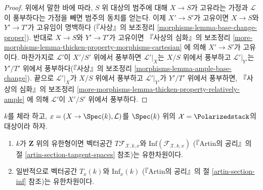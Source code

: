 \begin{proof}
\medskip\noindent
위에서 말한 바에 따라, $S$ 위 대상의 범주에 대해 $X \to S$가 고유라는
가정과 $\mathcal{L}$이 풍부하다는 가정을 빼면 범주의 동치를 얻는다.
이제 $X' \to S'$가 고유이면 $X \to S$와 $Y' \to T'$가 고유임이 명백하다
(『사상』의 보조정리
\ref{morphisms-lemma-base-change-proper}).
반대로 $X \to S$와 $Y' \to T'$가 고유이면 『사상의 심화』의 보조정리
\ref{more-morphisms-lemma-thicken-property-morphisms-cartesian}
에 의해 $X' \to S'$가 고유이다. 마찬가지로 $\mathcal{L}'$이 $X'/S'$ 위에서
풍부하면 $\mathcal{L}'|_X$는 $X/S$ 위에서 풍부하고
$\mathcal{L}'|_{Y'}$는 $Y'/T'$ 위에서 풍부하다(『사상』의 보조정리
\ref{morphisms-lemma-ample-base-change}). 끝으로 $\mathcal{L}'|_X$가 $X/S$
위에서 풍부하고 $\mathcal{L}'|_{Y'}$가 $Y'/T'$ 위에서 풍부하면,
『사상의 심화』의 보조정리
\ref{more-morphisms-lemma-thicken-property-relatively-ample}
에 의해 $\mathcal{L}'$이 $X'/S'$ 위에서 풍부하다.
\end{proof}

\begin{lemma}
\label{lemma-polarized-tangent-space}
$k$를 체라 하고, $x = (X \to \Spec(k), \mathcal{L})$를 $\Spec(k)$ 위의
$\mathcal{X} = \Polarizedstack$의 대상이라 하자.
\begin{enumerate}
\item $k$가 $\mathbf{Z}$ 위의 유한형이면 벡터공간
$T\mathcal{F}_{\mathcal{X}, k, x}$와
$\text{Inf}(\mathcal{F}_{\mathcal{X}, k, x})$
(『Artin의 공리』의 절 \ref{artin-section-tangent-spaces} 참조)는 유한차원이다.
\item 일반적으로 벡터공간 $T_x(k)$와 $\text{Inf}_x(k)$
(『Artin의 공리』의 절 \ref{artin-section-inf} 참조)는 유한차원이다.
\end{enumerate}
\end{lemma}

